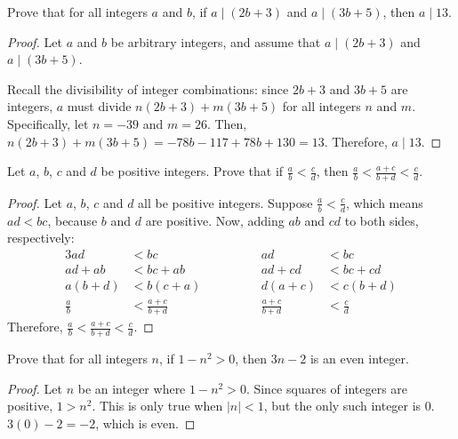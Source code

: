 \question Prove that for all integers $a$ and $b$, if $a \mid (2b + 3)$ and $a \mid (3b + 5)$, then $a \mid 13$.
\begin{proof}
  Let $a$ and $b$ be arbitrary integers, and assume that $a \mid (2b+3)$ and $a \mid (3b+5)$.

  Recall the divisibility of integer combinations: since $2b+3$ and $3b+5$ are integers,
  $a$ must divide $n(2b+3) + m(3b+5)$ for all integers $n$ and $m$.
  Specifically, let $n = -39$ and $m = 26$.
  Then, $n(2b+3) + m(3b+5) = -78b - 117 + 78b + 130 = 13$.
  Therefore, $a \mid 13$.
\end{proof}


\question Let $a$, $b$, $c$ and $d$ be positive integers.
Prove that if $\frac a b < \frac c d$, then $\frac a b < \frac{a+c}{b+d} < \frac c d$.
\begin{proof}
  Let $a$, $b$, $c$ and $d$ all be positive integers.
  Suppose $\frac a b < \frac c d$, which means $ad < bc$, because $b$ and $d$ are positive.
  Now, adding $ab$ and $cd$ to both sides, respectively:
  \begin{alignat*}{3}
    ad        & < bc              & \hspace{4em} ad              & < bc        \\
    ad + ab   & < bc + ab         & \hspace{4em} ad + cd         & < bc + cd   \\
    a(b+d)    & < b(c+a)          & \hspace{4em} d(a+c)          & < c(b+d)    \\
    \frac a b & < \frac{a+c}{b+d} & \hspace{4em} \frac{a+c}{b+d} & < \frac c d
  \end{alignat*}
  Therefore, $\frac a b < \frac{a+c}{b+d} < \frac c d$.
\end{proof}


\question Prove that for all integers $n$, if $1-n^2 > 0$, then $3n - 2$ is an even integer.
\begin{proof}
  Let $n$ be an integer where $1-n^2 > 0$.
  Since squares of integers are positive, $1 > n^2$.
  This is only true when $|n| < 1$, but the only such integer is 0.
  $3(0)-2=-2$, which is even.
\end{proof}


